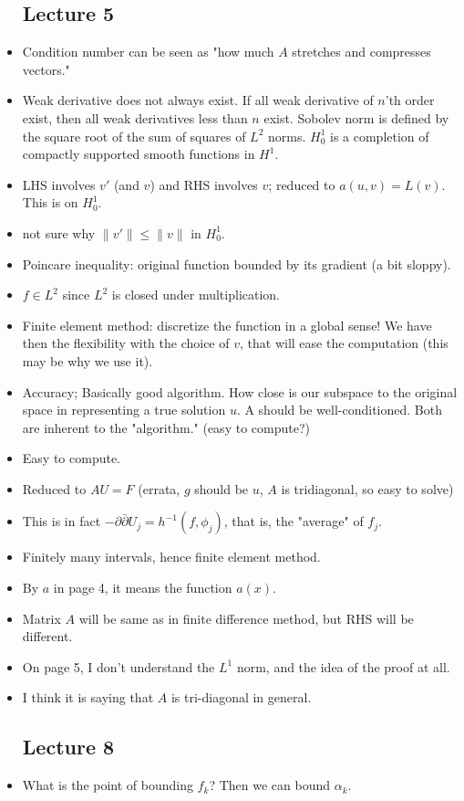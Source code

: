 \documentclass{article}
\theoremstyle{remark}
\begin{document}
\begin{itemize}
\subsection*{Lecture 5}
    \item Condition number can be seen as "how much $A$ stretches and compresses vectors."
    \item Weak derivative does not always exist. If all weak derivative of $n$'th order exist, then all weak derivatives less than $n$ exist. Sobolev norm is defined by the square root of the sum of squares of $L^2$ norms. $H_0^1$ is a completion of compactly supported smooth functions in $H^1$.
    \item LHS involves $v'$ (and $v$) and RHS involves $v$; reduced to $a(u,v)=L(v)$. This is on $H_0^1$.
    \item not sure why $\lVert v'\rVert\leq\lVert v\rVert$ in $H^1_0$.
    \item Poincare inequality: original function bounded by its gradient (a bit sloppy).
    \item $f\in L^2$ since $L^2$ is closed under multiplication.
    \item Finite element method: discretize the function in a global sense! We have then the flexibility with the choice of $v$, that will ease the computation (this may be why we use it).
    \item Accuracy; Basically good algorithm. How close is our subspace to the original space in representing a true solution $u$. A should be well-conditioned. Both are inherent to the "algorithm." (easy to compute?)
    \item Easy to compute.
    \item Reduced to $AU=F$ (errata, $g$ should be $u$, $A$ is tridiagonal, so easy to solve)
    \item This is in fact $-\partial\bar\partial U_j=h^{-1}(f, \phi_j)$, that is, the "average" of $f_j$.
    \item Finitely many intervals, hence finite element method.
    \item By $a$ in page 4, it means the function $a(x)$.
    \item Matrix $A$ will be same as in finite difference method, but RHS will be different.
    \item On page 5, I don't understand the $L^1$ norm, and the idea of the proof at all.
    \item I think it is saying that $A$ is tri-diagonal in general.
\subsection*{Lecture 8}
\item What is the point of bounding $f_k$? Then we can bound $\alpha_k$.

\end{itemize}
\end{document}
